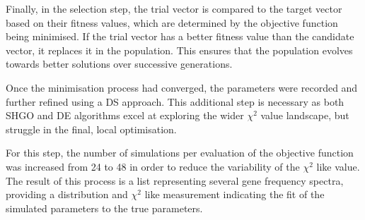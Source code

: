 Finally, in the selection step, the trial vector is compared to the target vector based on their fitness values, which are determined by the objective function being minimised.
If the trial vector has a better fitness value than the candidate vector, it replaces it in the population.
This ensures that the population evolves towards better solutions over successive generations.

Once the minimisation process had converged, the parameters were recorded and further refined using a \ac{DS} approach.
This additional step is necessary as both \ac{SHGO} and \ac{DE} algorithms excel at exploring the wider $\chi^2$ value landscape,
but struggle in the final, local optimisation.

For this step, the number of simulations per evaluation of the objective function was increased
from 24 to 48 in order to reduce the variability of the $\chi^2$ like value.
The result of this process is a list representing several gene frequency spectra,
providing a distribution and $\chi^2$ like measurement indicating the fit of the simulated parameters to the true parameters.
